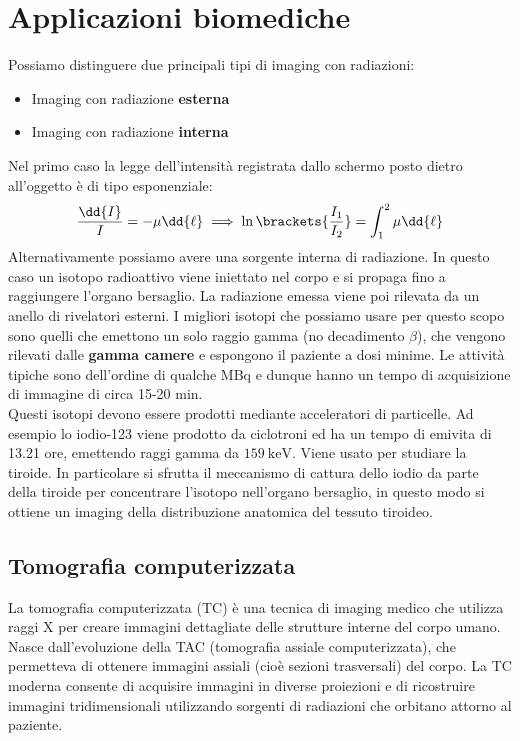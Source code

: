 \chapter{Applicazioni biomediche}
Possiamo distinguere due principali tipi di imaging con radiazioni:
\begin{itemize}
    \item Imaging con radiazione \textbf{esterna}
    \item Imaging con radiazione \textbf{interna}
\end{itemize}
Nel primo caso la legge dell'intensità registrata dallo schermo posto dietro all'oggetto è di tipo esponenziale:
\begin{equation}
    \dfrac{\dd{I}}{I} = -\mu \dd{\ell} \implies \ln\brackets{\dfrac{I_1}{I_2}} = \int_{1}^{2} \mu \dd{\ell}
\end{equation}
Alternativamente possiamo avere una sorgente interna di radiazione. In questo caso un isotopo radioattivo viene iniettato nel corpo e si propaga fino a raggiungere l'organo bersaglio. La radiazione emessa viene poi rilevata da un anello di rivelatori esterni. I migliori isotopi che possiamo usare per questo scopo sono quelli che emettono un solo raggio gamma (no decadimento $\beta$), che vengono rilevati dalle \textbf{gamma camere} e espongono il paziente a dosi minime. Le attività tipiche sono dell'ordine di qualche $\si{\mega\becquerel}$ e dunque hanno un tempo di acquisizione di immagine di circa 15-20 min.\\
Questi isotopi devono essere prodotti mediante acceleratori di particelle. Ad esempio lo iodio-123 viene prodotto da ciclotroni ed ha un tempo di emivita di 13.21 ore, emettendo raggi gamma da $\qty{159}{\kilo\electronvolt}$. Viene usato per studiare la tiroide. In particolare si sfrutta il meccanismo di cattura dello iodio da parte della tiroide per concentrare l'isotopo nell'organo bersaglio, in questo modo si ottiene un imaging della distribuzione anatomica del tessuto tiroideo.\\
\section{Tomografia computerizzata}
La tomografia computerizzata (TC) è una tecnica di imaging medico che utilizza raggi X per creare immagini dettagliate delle strutture interne del corpo umano. Nasce dall'evoluzione della TAC (tomografia assiale computerizzata), che permetteva di ottenere immagini assiali (cioè sezioni trasversali) del corpo. La TC moderna consente di acquisire immagini in diverse proiezioni e di ricostruire immagini tridimensionali utilizzando sorgenti di radiazioni che orbitano attorno al paziente.\\

